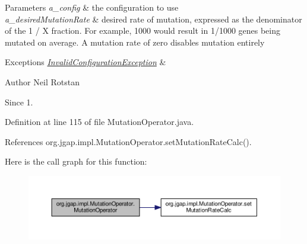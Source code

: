\begin{DoxyParams}{Parameters}
{\em a\-\_\-config} & the configuration to use \\
\hline
{\em a\-\_\-desired\-Mutation\-Rate} & desired rate of mutation, expressed as the denominator of the 1 / X fraction. For example, 1000 would result in 1/1000 genes being mutated on average. A mutation rate of zero disables mutation entirely \\
\hline
\end{DoxyParams}

\begin{DoxyExceptions}{Exceptions}
{\em \hyperlink{classorg_1_1jgap_1_1_invalid_configuration_exception}{Invalid\-Configuration\-Exception}} & \\
\hline
\end{DoxyExceptions}
\begin{DoxyAuthor}{Author}
Neil Rotstan 
\end{DoxyAuthor}
\begin{DoxySince}{Since}
1. 
\end{DoxySince}


Definition at line 115 of file Mutation\-Operator.\-java.



References org.\-jgap.\-impl.\-Mutation\-Operator.\-set\-Mutation\-Rate\-Calc().



Here is the call graph for this function\-:
\nopagebreak
\begin{figure}[H]
\begin{center}
\leavevmode
\includegraphics[width=350pt]{classorg_1_1jgap_1_1impl_1_1_mutation_operator_abdacf3ee2ef8a6f544af2424f9682ec8_cgraph}
\end{center}
\end{figure}




